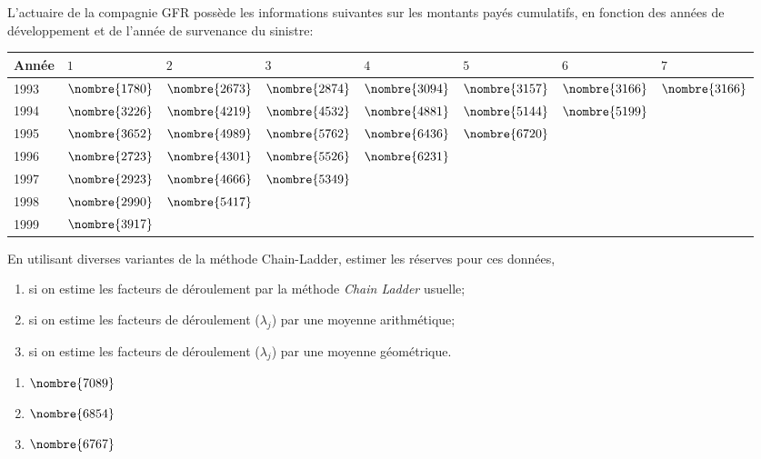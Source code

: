 \begin{exercice}
  L'actuaire de la compagnie GFR possède les informations suivantes
  sur les montants payés cumulatifs, en fonction des années de
  développement et de l'année de survenance du sinistre:
  \begin{center}
    \begin{tabular}{|l|l l l l l l l|}\hline
      Année & $1$ & $2$ & $3$ & $4$ & $5$ & $6$ & $7$\\ \hline
      1993 & $\nombre{1780}$ & $\nombre{2673}$ & $\nombre{2874}$ & $\nombre{3094}$ & $\nombre{3157}$ & $\nombre{3166}$ & $\nombre{3166}$ \\
      1994 & $\nombre{3226}$ & $\nombre{4219}$ & $\nombre{4532}$ & $\nombre{4881}$ & $\nombre{5144}$ & $\nombre{5199}$ & \\
      1995 & $\nombre{3652}$ & $\nombre{4989}$ & $\nombre{5762}$ & $\nombre{6436}$ & $\nombre{6720}$ & & \\
      1996 & $\nombre{2723}$ & $\nombre{4301}$ & $\nombre{5526}$ & $\nombre{6231}$ & & & \\
      1997 & $\nombre{2923}$ & $\nombre{4666}$ & $\nombre{5349}$ & & & & \\
      1998 & $\nombre{2990}$ & $\nombre{5417}$ & & & & & \\
      1999 & $\nombre{3917}$ & & & & & &\\ \hline
    \end{tabular}
  \end{center}
  En utilisant diverses variantes de la méthode Chain-Ladder, estimer
  les réserves pour ces données,
  \begin{enumerate}
  \item si on estime les facteurs de déroulement par la méthode
    \emph{Chain Ladder} usuelle;
  \item si on estime les facteurs de déroulement ($\lambda_j$) par une
    moyenne arithmétique;
  \item si on estime les facteurs de déroulement ($\lambda_j$) par une
    moyenne géométrique.
  \end{enumerate}
  \begin{rep}
    \begin{enumerate}
    \item $\nombre{7089}$
    \item $\nombre{6854}$
    \item $\nombre{6767}$
    \end{enumerate}
  \end{rep}
  \begin{sol}

\end{sol}
\end{exercice}
